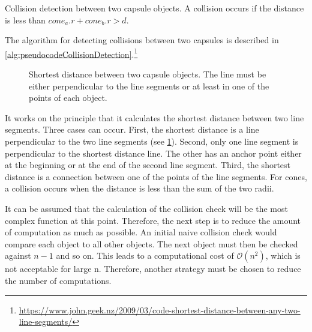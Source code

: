 \begin{lstfloat}[!t]
\caption{Collision detection between two capsule objects. A collision occurs if the distance is less than $\mathit{cone_a.r}+\mathit{cone_b.r} > d$.}
\label{alg:pseudocodeCollisionDetection}
\end{lstfloat}
% 
The algorithm for detecting collisions between two capsules is described in \cref{alg:pseudocodeCollisionDetection}.\footnote{\href{https://www.john.geek.nz/2009/03/code-shortest-distance-between-any-two-line-segments/}{https://www.john.geek.nz/2009/03/code-shortest-distance-between-any-two-line-segments/}}
%
\begin{figure}[!t]
    \centering
    \def\tikzheight{0.5\textwidth}
	\caption{Shortest distance between two capsule objects. The line must be either perpendicular to the line segments or at least in one of the points of each object.}
	\label{fig:shortDist}
\end{figure}
%
It works on the principle that it calculates the shortest distance between two line segments.
Three cases can occur.
First, the shortest distance is a line perpendicular to the two line segments (see \cref{fig:shortDist}).
Second, only one line segment is perpendicular to the shortest distance line.
The other has an anchor point either at the beginning or at the end of the second line segment.
Third, the shortest distance is a connection between one of the points of the line segments.
For cones, a collision occurs when the distance is less than the sum of the two radii.
\par
% 
It can be assumed that the calculation of the collision check will be the most complex function at this point.
Therefore, the next step is to reduce the amount of computation as much as possible.
An initial naive collision check would compare each object to all other objects.
The next object must then be checked against $n-1$ and so on.
This leads to a computational cost of $\mathcal{O}(n^{2})$, which is not acceptable for large n.
Therefore, another strategy must be chosen to reduce the number of computations.
%
% 
% 

